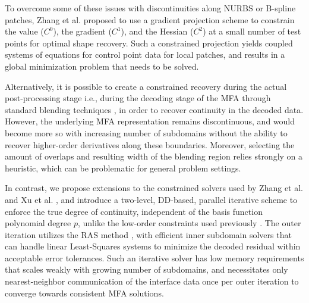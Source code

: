 To overcome some of these issues with discontinuities along NURBS or B-spline patches, Zhang et al. \cite{zhang-nurbs-continuity} proposed to use a gradient projection scheme to constrain the value ($C^0$), the gradient ($C^1$), and the Hessian ($C^2$) at a small number of test points for optimal shape recovery. Such a constrained projection yields coupled systems of equations for control point data for local patches, and results in a global minimization problem that needs to be solved.

Alternatively, it is possible to create a constrained recovery during the actual post-processing stage i.e., during the decoding stage of the MFA through standard blending techniques \cite{grindeanu-blending}, in order to recover continuity in the decoded data. However, the underlying MFA representation remains discontinuous, and would become more so with increasing number of subdomains without the ability to recover higher-order derivatives along these boundaries. Moreover, selecting the amount of overlaps and resulting width of the blending region relies strongly on a heuristic, which can be problematic for general problem settings.

In contrast, we propose extensions to the constrained solvers used by Zhang et al. \cite{zhang-nurbs-continuity} and Xu et al. \cite{xu-jahn-discrete-adjoint}, and introduce a two-level, DD-based, parallel iterative scheme to enforce the true degree of continuity, independent of the basis function polynomial degree $p$, unlike the low-order constraints used previously  \cite{zhang-nurbs-continuity}. The outer iteration utilizes the RAS method \cite{gander-rasm}, with efficient inner subdomain solvers that can handle linear Least-Squares systems to minimize the decoded residual within acceptable error tolerances. %
Such an iterative solver has low memory requirements that scales weakly with growing number of subdomains, and necessitates only nearest-neighbor communication of the interface data once per outer iteration to converge towards consistent MFA solutions.
